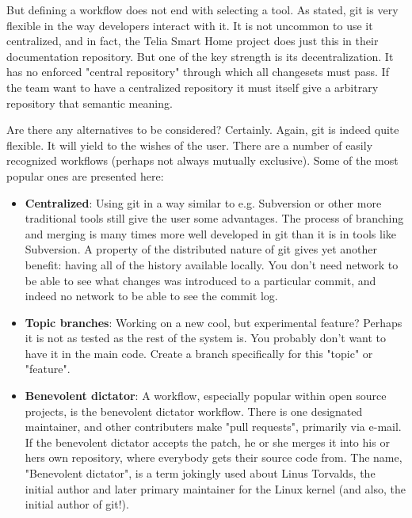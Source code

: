 \documentclass{llncs}
\begin{document}
But defining a workflow does not end with selecting a tool. As stated, 
git is very flexible in the way developers interact with it. It is not
uncommon to use it centralized, and in fact, the Telia Smart Home project
does just this in their documentation repository. But one of the key 
strength is its decentralization. It has no enforced "central repository"
through which all changesets must pass. If the team want to have a 
centralized repository it must itself give a arbitrary repository that
semantic meaning.

Are there any alternatives to be considered? Certainly. Again, git is 
indeed quite flexible. It will yield to the wishes of the user. There are 
a number of easily recognized workflows (perhaps not always mutually
exclusive). Some of the most popular ones are presented here:

\begin{itemize}
 \item \textbf{Centralized}: 
  Using git in a way similar to e.g. Subversion or other more traditional
  tools still give the user some advantages. The process of branching and
  merging is many times more well developed in git than it is in tools like
  Subversion. A property of the distributed nature of git gives yet another
  benefit: having all of the history available locally. You don't need
  network to be able to see what changes was introduced to a particular
  commit, and indeed no network to be able to see the commit log.

 \item \textbf{Topic branches}: 
  Working on a new cool, but experimental feature? Perhaps it is not as 
  tested as the rest of the system is. You probably don't want to have 
  it in the main code. Create a branch specifically for this "topic" or
  "feature".

 \item \textbf{Benevolent dictator}: 
  A workflow, especially popular within open source projects, is the
  benevolent dictator workflow. There is one designated maintainer, and
  other contributers make "pull requests", primarily via e-mail.  If the
  benevolent dictator accepts the patch, he or she merges it into his or
  hers own repository, where everybody gets their source code from. The
  name, "Benevolent dictator", is a term jokingly used about Linus
  Torvalds, the initial author and later primary maintainer for the Linux
  kernel (and also, the initial author of git!).
\end{itemize}
\end{document}
